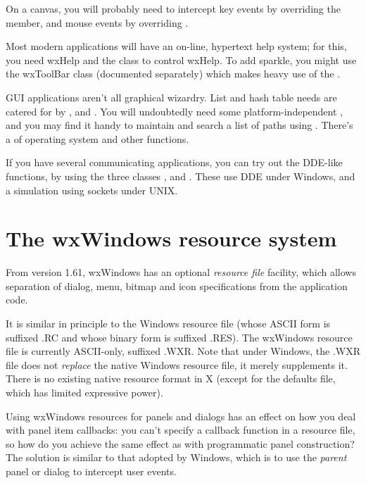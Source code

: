 On a canvas, you will probably need to intercept key events by overriding the
\rtfsp{} member, and mouse events by overriding .

Most modern applications will have an on-line, hypertext help system; for this, you
need wxHelp and the  class to control
wxHelp. To add sparkle, you might use the wxToolBar class (documented separately)
which makes heavy use of the .

GUI applications aren't all graphical wizardry. List and hash table needs are
catered for by ,  and .
You will undoubtedly need some platform-independent ,
and you may find it handy to maintain and search a list of paths using .
There's a  of operating system and other functions.

If you have several communicating applications, you can try out the DDE-like functions, by
using the three classes ,  and
\rtfsp{}. These use DDE under Windows, and a simulation using
sockets under UNIX.

\section{The wxWindows resource system}\label{resourceformats}

From version 1.61, wxWindows has an optional {\it resource file} facility,
which allows separation of dialog, menu, bitmap and icon specifications
from the application code.

It is similar in principle to the Windows resource file (whose ASCII form is
suffixed .RC and whose binary form is suffixed .RES). The wxWindows resource
file is currently ASCII-only, suffixed .WXR. Note that under Windows,
the .WXR file does not {\it replace} the native Windows resource file,
it merely supplements it. There is no existing native resource format in X
(except for the defaults file, which has limited expressive power).

Using wxWindows resources for panels and dialogs has an effect on how
you deal with panel item callbacks: you can't specify a callback function in
a resource file, so how do you achieve the same effect as with programmatic
panel construction? The solution is similar to that adopted by Windows, which
is to use the {\it parent} panel or dialog to intercept user events.

